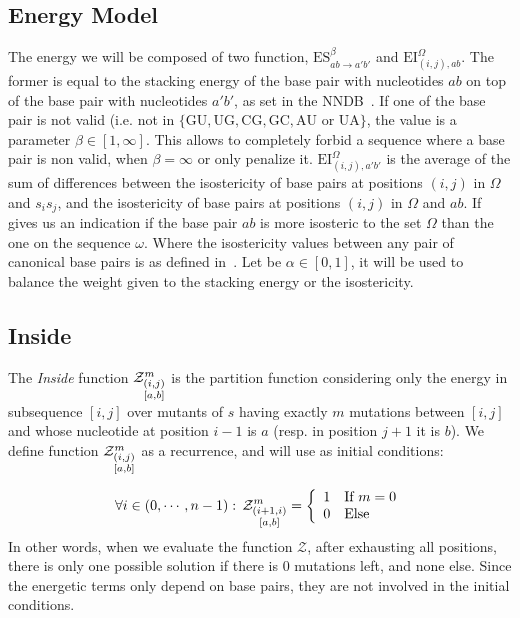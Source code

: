 \subsection{Energy Model}
The energy we will be composed of two function, $\text{ES}^{\beta}_{ab\to a'b'}$ and 
$\text{EI}^{\Omega}_{(i,j),ab}$. The former is equal to the 
stacking energy of the base pair with nucleotides $ab$ on top of the base pair with nucleotides 
$a'b'$, as set in the NNDB~\cite{Turner2010}. If one of the base pair is not valid (i.e. not in 
$\{\text{GU},\text{UG},\text{CG},\text{GC}, \text{AU or UA}\}$, the value is a parameter 
$\beta \in [1,\infty]$. This allows
to completely forbid a sequence where a base pair is non valid, when $\beta = \infty$ or only 
penalize it.
$\text{EI}^{\Omega}_{(i,j), a'b'}$ is the average of the sum of differences between the isostericity
of base pairs at positions $(i,j)$ in $\Omega$ and $s_is_j$, and the isostericity of base pairs
 at positions $(i,j)$ in $\Omega$ and $ab$. If gives us an indication 
 if the base pair $ab$ is more isosteric to the set $\Omega$ than the one on the sequence 
 $\omega$. Where the isostericity values 
 between any pair of canonical base pairs is  as defined in~\cite{Stombaugh2009}. 
 Let be $\alpha\in[0,1]$, it 
 will be used to balance the weight given to the stacking energy or the isostericity.
	
\subsection{Inside}
The \emph{Inside} function $\Z{i,j}{m}{a,b}$ is the partition function considering only the 
energy in subsequence $[i,j]$ over mutants of $s$ having exactly $m$ mutations between $[i,j]$ and whose nucleotide at position $i-1$ is $a$ (resp. in position $j+1$ it is $b$).
We define function $\Z{i,j}{m}{a,b}$ as a recurrence, and will use as initial conditions:

\[
	\forall i \in (0,\cdots,n-1):\, \Z{i+1,i}{m}{a,b}=\left\{
	\begin{array}{ll}
		1 &\text{If } m = 0\\
		0 &\text{Else }
	\end{array}\right.
\]
In other words, when we evaluate the function $\mathcal Z$, after exhausting all positions, there 
is only one possible solution if there is $0$ mutations left, and none else. Since the 
energetic terms only depend on base pairs, they are not involved in the initial conditions. 

